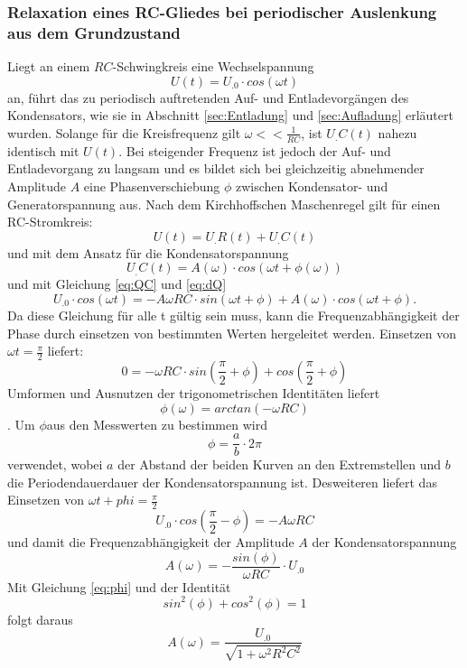 \subsubsection{Relaxation eines RC-Gliedes bei periodischer Auslenkung aus dem Grundzustand}
Liegt an einem $RC$-Schwingkreis eine Wechselspannung
\[
U(t)= U_.0\cdot cos(\omega t)
\]
an, führt das zu periodisch auftretenden Auf- und Entladevorgängen des Kondensators, wie sie in Abschnitt \ref{sec:Entladung} und \ref{sec:Aufladung} erläutert wurden.
Solange für die Kreisfrequenz gilt $\omega << \frac{1}{RC}$, ist $U_.C(t)$ nahezu identisch mit $U(t)$. Bei steigender Frequenz ist jedoch der Auf- und Entladevorgang zu langsam und es bildet sich bei gleichzeitig abnehmender Amplitude $A$ eine Phasenverschiebung $\phi$ zwischen Kondensator- und Generatorspannung aus.
Nach dem Kirchhoffschen Maschenregel gilt für einen RC-Stromkreis:
\begin{equation}
U(t)=U_.R(t)+U_.C(t)\label{eq:U1}
\end{equation}
und mit dem Ansatz für die Kondensatorspannung
\[
U_.C(t)= A(\omega)\cdot cos(\omega t + \phi (\omega))
\]
und mit Gleichung \eqref{eq:QC} und \eqref{eq:dQ}
\begin{equation}
U_.0\cdot cos(\omega t) = -A\omega RC\cdot sin(\omega t + \phi) + A(\omega)\cdot cos(\omega t + \phi)\text{.}\label{eq:U2}
\end{equation}
Da diese Gleichung für alle t gültig sein muss, kann die Frequenzabhängigkeit der Phase durch einsetzen von bestimmten Werten hergeleitet werden.
Einsetzen von $\omega t=\frac{\pi}{2}$ liefert:
\[
0 = -\omega RC\cdot sin\left(\frac{\pi}{2}+\phi\right)+ cos\left(\frac{\pi}{2}+\phi\right)
\]
Umformen und Ausnutzen der trigonometrischen Identitäten liefert
\begin{equation}
\phi (\omega)= arctan(-\omega RC)\label{eq:phi}
\end{equation}.
Um $\phi$aus den Messwerten zu bestimmen wird
\begin{equation}
\phi = \frac{a}{b}\cdot 2\pi \label{eq:phi1}
\end{equation}
verwendet, wobei $a$ der Abstand der beiden Kurven an den Extremstellen und $b$ die Periodendauerdauer der Kondensatorspannung ist.
Desweiteren liefert das Einsetzen von $\omega t + phi = \frac{\pi}{2}$
\[
U_.0\cdot cos\left(\frac{\pi}{2}-\phi\right)= -A\omega RC
\]
und damit die Frequenzabhängigkeit der Amplitude $A$ der Kondensatorspannung
\begin{equation}
A(\omega)=-\frac{sin(\phi)}{\omega RC}\cdot U_.0\label{eq:A1}
\end{equation}
Mit Gleichung \eqref{eq:phi} und der Identität
\[
sin^2(\phi)+cos^2(\phi)=1
\]
folgt daraus
\begin{equation}
A(\omega)=\frac{U_.0}{\sqrt{1+\omega^2R^2C^2}}\label{eq:A2}
\end{equation}
